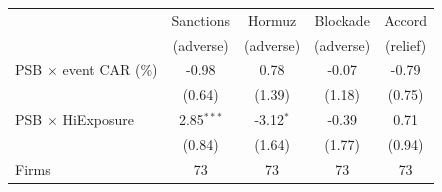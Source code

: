 \begin{tabular}{lcccc}
\toprule
 & Sanctions & Hormuz & Blockade & Accord \\
 & (adverse) & (adverse) & (adverse) & (relief) \\
\midrule
PSB $\times$ event CAR (\%) & -0.98 & 0.78 & -0.07 & -0.79 \\
  & (0.64) & (1.39) & (1.18) & (0.75) \\
\midrule
PSB $\times$ HiExposure & 2.85$^{***}$ & -3.12$^{*}$ & -0.39 & 0.71 \\
  & (0.84) & (1.64) & (1.77) & (0.94) \\
\midrule
Firms & 73 & 73 & 73 & 73 \\
\bottomrule
\end{tabular}